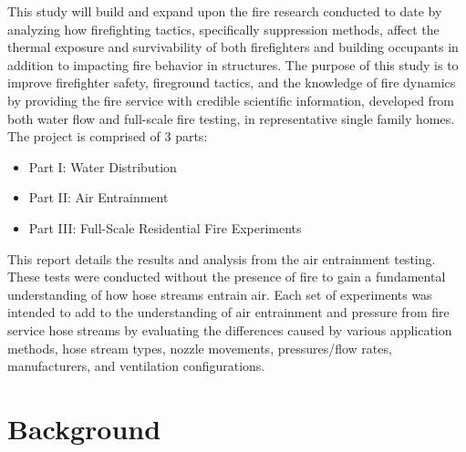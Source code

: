 \documentclass[12pt,oneside]{book}
\begin{document}
\vspace*{\baselineskip}

This study will build and expand upon the fire research conducted to date by analyzing how firefighting tactics, specifically suppression methods, affect the thermal exposure and survivability of both firefighters and building occupants in addition to impacting fire behavior in structures. The purpose of this study is to improve firefighter safety, fireground tactics, and the knowledge of fire dynamics by providing the fire service with credible scientific information, developed from both water flow and full-scale fire testing, in representative single family homes. The project is comprised of 3 parts:
\vspace*{\baselineskip}
\begin{itemize}
	\item Part I:  Water Distribution
	\item Part II: Air Entrainment
	\item Part III: Full-Scale Residential Fire Experiments
	\end{itemize}
\vspace*{\baselineskip}

This report details the results and analysis from the air entrainment testing. These tests were conducted without the presence of fire to gain a fundamental understanding of how hose streams entrain air. Each set of experiments was intended to add to the understanding of air entrainment and pressure from fire service hose streams by evaluating the differences caused by various application methods, hose stream types, nozzle movements, pressures/flow rates, manufacturers, and ventilation configurations.




\newpage

\chapter{Background}
\end{document}

